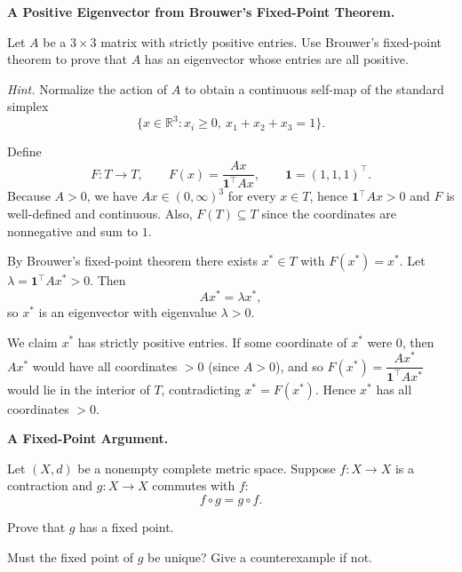 \begin{problem}[CP-II-0464]
\label{prob:cp-ii-0464}
\textbf{A Positive Eigenvector from Brouwer's Fixed-Point Theorem.}

\hspace*{1.5em}Let \(A\) be a \(3\times3\) matrix with strictly positive entries. Use
Brouwer's fixed-point theorem to prove that \(A\) has an eigenvector whose
entries are all positive.

\emph{Hint.} Normalize the action of \(A\) to obtain a continuous self-map of
the standard simplex
\[
\{x\in\mathbb R^3:x_i\ge0,\ x_1+x_2+x_3=1\}.
\]
\end{problem}

\begin{solution}
Define
\[
F:T\to T,\qquad F(x)=\frac{Ax}{\mathbf{1}^\top Ax},\qquad \mathbf{1}=(1,1,1)^\top .
\]
Because $A>0$, we have $Ax\in(0,\infty)^3$ for every $x\in T$, hence $\mathbf{1}^\top Ax>0$
and $F$ is well-defined and continuous. Also, $F(T)\subseteq T$ since the coordinates are
nonnegative and sum to $1$.

By Brouwer's fixed-point theorem there exists $x^\ast\in T$ with $F(x^\ast)=x^\ast$.
Let $\lambda=\mathbf{1}^\top Ax^\ast>0$. Then
\[
Ax^\ast=\lambda x^\ast ,
\]
so $x^\ast$ is an eigenvector with eigenvalue $\lambda>0$.

We claim $x^\ast$ has strictly positive entries. If some coordinate of $x^\ast$ were $0$,
then $Ax^\ast$ would have all coordinates $>0$ (since $A>0$), and so
$F(x^\ast)=\dfrac{Ax^\ast}{\mathbf{1}^\top Ax^\ast}$ would lie in the interior of $T$,
contradicting $x^\ast=F(x^\ast)$. Hence $x^\ast$ has all coordinates $>0$.

\bigskip
\end{solution}

\begin{problem}[CP-II-0469]
\label{prob:cp-ii-0469}
\textbf{A Fixed-Point Argument.}

\hspace*{1.5em}Let \((X,d)\) be a nonempty complete metric space. Suppose
\(f:X\to X\) is a contraction and \(g:X\to X\) commutes with \(f\):
\[
f\circ g=g\circ f.
\]

Prove that \(g\) has a fixed point.

Must the fixed point of \(g\) be unique? Give a counterexample if not.
\end{problem}

